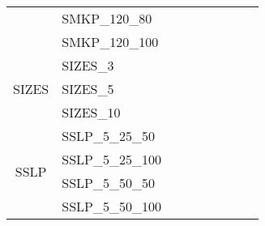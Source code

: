 \begin{table}[]
{\begin{tabular}{|c|l|ll|ll|l|l|l|}
			& SMKP\_120\_80                 &                                 &                                &                                  &                                 &                                    &                            &                            \\
			& SMKP\_120\_100                &                                 &                                &                                  &                                 &                                    &                            &                            \\ \hline
			\multirow{3}{*}{SIZES}   & SIZES\_3                      &                                 &                                &                                  &                                 &                                    &                            &                            \\
			& SIZES\_5                      &                                 &                                &                                  &                                 &                                    &                            &                            \\
			& SIZES\_10                     &                                 &                                &                                  &                                 &                                    &                            &                            \\ \hline
			\multirow{8}{*}{SSLP}    & SSLP\_5\_25\_50               &                                 &                                &                                  &                                 &                                    &                            &                            \\
			& SSLP\_5\_25\_100              &                                 &                                &                                  &                                 &                                    &                            &                            \\
			& SSLP\_5\_50\_50               &                                 &                                &                                  &                                 &                                    &                            &                            \\
			& SSLP\_5\_50\_100              &                                 &                                &                                  &                                 &                                    &                            &                            \\

\end{tabular}}
\end{table}
